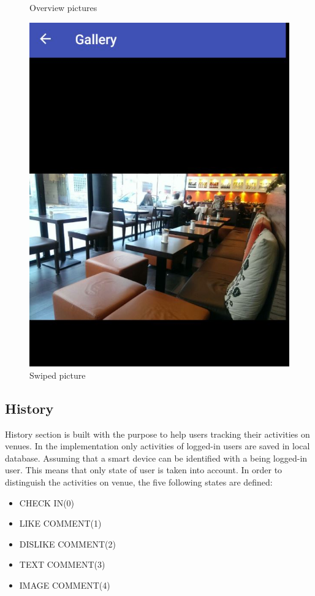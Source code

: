 \begin{figure}[!htb]
    \caption{Overview pictures}\label{fig:overimages}
	\includegraphics[width=\linewidth]{images/swipeimage.jpg}
	\caption{Swiped picture}\label{fig:swipeimage}
	\endminipage\hfill

\end{figure}

\subsection{History}
History section is built with the purpose to help users tracking their activities on venues. In the implementation  only activities of logged-in users are saved in local database. Assuming that a smart device can be identified with a being logged-in user. This means that only state of user is taken into account. In order to distinguish the activities on venue, the five following states are defined:

\begin{itemize}
	\item CHECK IN(0)
	\item LIKE COMMENT(1)
	\item DISLIKE COMMENT(2)
	\item TEXT COMMENT(3)
	\item IMAGE COMMENT(4)
\end{itemize}

